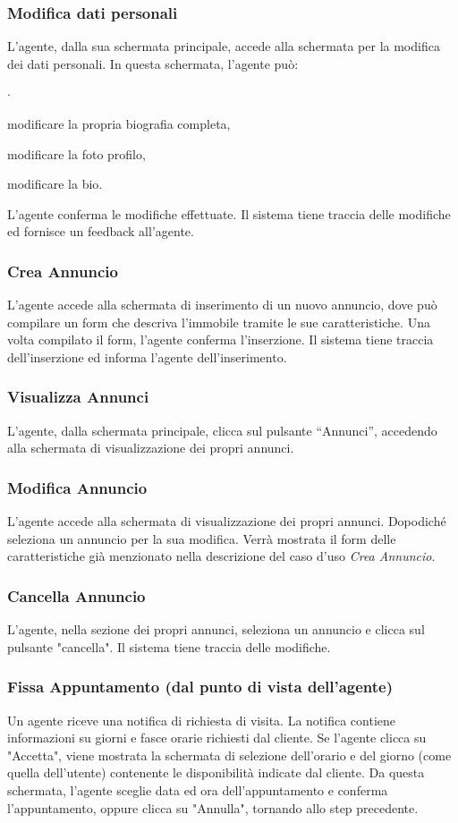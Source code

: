 \subsubsection{Modifica dati personali}
L'agente, dalla sua schermata principale, accede alla schermata per la 
modifica dei dati personali. In questa schermata, l'agente può:
\begin{list}{$\cdot$}{}
    \item modificare la propria biografia completa,
    \item modificare la foto profilo,
    \item modificare la bio.
\end{list} 
L'agente conferma le modifiche effettuate. Il sistema tiene traccia 
delle modifiche ed fornisce un feedback all'agente.

\subsubsection{Crea Annuncio}
L'agente accede alla schermata di inserimento di un nuovo annuncio, dove 
può compilare un form che descriva l'immobile tramite le sue caratteristiche.
Una volta compilato il form, l'agente conferma l'inserzione. 
Il sistema tiene traccia dell'inserzione ed informa l'agente dell'inserimento.

\subsubsection{Visualizza Annunci}
L'agente, dalla schermata principale, clicca sul pulsante “Annunci”, accedendo 
alla schermata di visualizzazione dei propri annunci.

\subsubsection{Modifica Annuncio}
L'agente accede alla schermata di visualizzazione dei propri annunci. Dopodiché 
seleziona un annuncio per la sua modifica. Verrà mostrata il form delle 
caratteristiche già menzionato nella descrizione del caso d'uso \textit{Crea Annuncio}.

\subsubsection{Cancella Annuncio}
L'agente, nella sezione dei propri annunci, seleziona un annuncio e clicca sul 
pulsante "cancella". Il sistema tiene traccia delle modifiche.

\subsubsection{Fissa Appuntamento (dal punto di vista dell'agente)}
Un agente riceve una notifica di richiesta di visita.
La notifica contiene informazioni su giorni e fasce orarie richiesti
dal cliente.
Se l'agente clicca su "Accetta", viene mostrata la schermata di selezione 
dell'orario e del giorno (come quella dell'utente) contenente le disponibilità 
indicate dal cliente. Da questa schermata, l'agente sceglie data ed ora 
dell'appuntamento e conferma l'appuntamento, oppure clicca su "Annulla", 
tornando allo step precedente.
